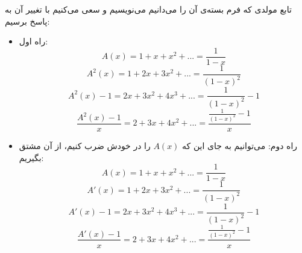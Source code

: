\p
    تابع مولدی که فرم بسته‌ی آن را می‌دانیم می‌نویسیم و سعی می‌کنیم با تغییر آن به پاسخ برسیم:
\begin{itemize}
    \item 
    راه اول:
    $$ A(x) = 1 + x + x^2 + ... = \frac{1}{1 - x} $$ 
    $$ A^2(x) = 1 + 2x + 3x^2 + ... = \frac{1}{(1 - x)^2}$$ 
    $$ A^2(x) - 1 = 2x + 3x^2 + 4x^3 + ... = \frac{1}{(1 - x)^2} - 1$$
    $$ \frac{A^2(x) - 1}{x} = 2 + 3x + 4x^2 + ... = \frac{\frac{1}{(1 - x)^2} - 1}{x}$$
   \item
    راه دوم:
    می‌توانیم به جای این که
    $A(x)$
    را در خودش ضرب کنیم، از آن مشتق بگیریم:
    $$ A(x) = 1 + x + x^2 + ... = \frac{1}{1 - x} $$ 
    $$ A'(x) = 1 + 2x + 3x^2 + ... = \frac{1}{(1 - x)^2}$$
    $$ A'(x) - 1 = 2x + 3x^2 + 4x^3 + ... = \frac{1}{(1 - x)^2} - 1$$
    $$ \frac{A'(x) - 1}{x} = 2 + 3x + 4x^2 + ... = \frac{\frac{1}{(1 - x)^2} - 1}{x}$$
\end{itemize}